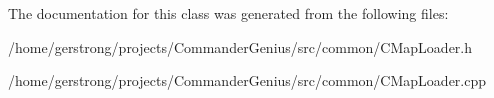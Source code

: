 The documentation for this class was generated from the following files:\begin{DoxyCompactItemize}
\item 
/home/gerstrong/projects/CommanderGenius/src/common/CMapLoader.h\item 
/home/gerstrong/projects/CommanderGenius/src/common/CMapLoader.cpp\end{DoxyCompactItemize}
